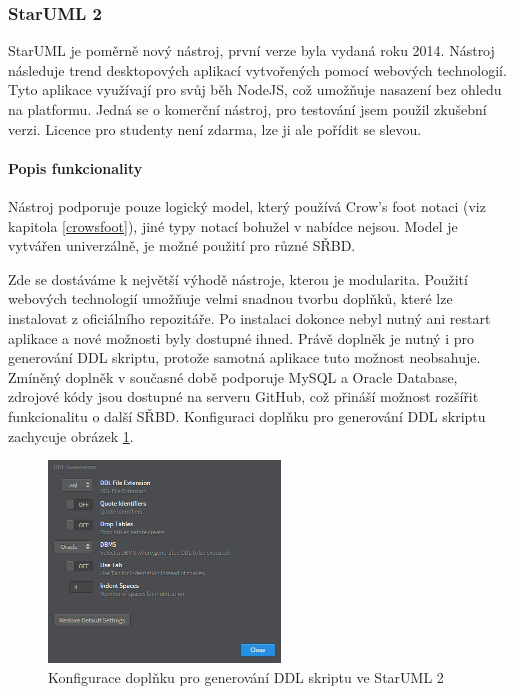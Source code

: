\documentclass[czech,bachelor,public,dept460,male,oneside]{diploma}
\begin{document}
		\subsubsection{StarUML 2}
		StarUML je poměrně nový nástroj, první verze byla vydaná roku 2014. Nástroj následuje trend desktopových aplikací vytvořených pomocí webových technologií. Tyto aplikace využívají pro svůj běh NodeJS, což umožňuje nasazení bez ohledu na platformu. Jedná se o komerční nástroj, pro testování jsem použil zkušební verzi. Licence pro studenty není zdarma, lze ji ale pořídit se slevou.
		
		\paragraph{Popis funkcionality}
		Nástroj podporuje pouze logický model, který používá Crow's foot notaci (viz kapitola \ref{crowsfoot}), jiné typy notací bohužel v nabídce nejsou. Model je vytvářen univerzálně, je možné  použití pro různé SŘBD. 
		
		Zde se dostáváme k největší výhodě nástroje, kterou je modularita. Použití webových technologií umožňuje velmi snadnou tvorbu doplňků, které lze instalovat z oficiálního repozitáře. Po instalaci dokonce nebyl nutný ani restart aplikace a nové možnosti byly dostupné ihned. Právě doplněk je nutný i pro generování DDL skriptu, protože samotná aplikace tuto možnost neobsahuje. Zmíněný doplněk v současné době podporuje MySQL a Oracle Database, zdrojové kódy jsou dostupné na serveru GitHub, což přináší možnost rozšířit funkcionalitu o další SŘBD. Konfiguraci doplňku pro generování DDL skriptu zachycuje obrázek \ref{fig:editStar}.
		
		\begin{figure}[H]
			\centering
			\includegraphics[width=0.55\textwidth]{Figures/EditorStar}
			\caption[Konfigurace doplňku pro generování DDL skriptu ve StarUML 2]{Konfigurace doplňku pro generování DDL skriptu ve StarUML 2}
			\label{fig:editStar}
		\end{figure}
		
\end{document}
